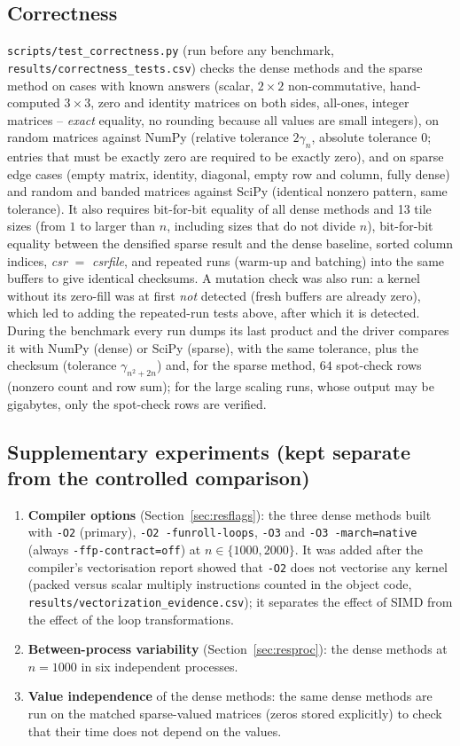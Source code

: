 \subsection{Correctness}
\label{sec:correct}
\texttt{scripts/test\_correctness.py} (run before any benchmark, \texttt{results/correctness\_tests.csv}) checks the dense methods and the sparse method on cases with known answers
(scalar, $2\times2$ non-commutative, hand-computed $3\times3$, zero and identity matrices on both sides, all-ones, integer matrices -- \emph{exact} equality, no rounding because all values are
small integers), on random matrices against NumPy (relative tolerance $2\gamma_n$, absolute tolerance $0$; entries that must be exactly zero are required to be exactly zero), and on sparse edge cases (empty matrix, identity, diagonal,
empty row and column, fully dense) and random and banded matrices against SciPy (identical nonzero pattern, same tolerance). It also requires bit-for-bit equality of all dense methods
and 13 tile sizes (from $1$ to larger than $n$, including sizes that do not divide $n$), bit-for-bit equality between the densified sparse result and the dense baseline, sorted column indices, \emph{csr} $=$ \emph{csrfile}, and repeated runs
(warm-up and batching) into the same buffers to give identical checksums. A mutation check was also run: a kernel without its zero-fill was at first \emph{not} detected (fresh buffers are already zero), which led to adding the repeated-run tests above, after which it is detected. During the benchmark every run dumps its last product and the driver compares it with NumPy (dense) or SciPy (sparse), with the same tolerance, plus the checksum
(tolerance $\gamma_{n^2+2n}$) and, for the sparse method, $64$ spot-check rows (nonzero count and row sum); for the large scaling runs, whose output may be gigabytes, only the spot-check rows are verified.

\subsection{Supplementary experiments (kept separate from the controlled comparison)}
\label{sec:supp}
\begin{enumerate}
  \item \textbf{Compiler options} (Section~\ref{sec:resflags}): the three dense methods built with \texttt{-O2} (primary), \texttt{-O2 -funroll-loops}, \texttt{-O3} and \texttt{-O3 -march=native}
        (always \texttt{-ffp-contract=off}) at $n\in\{1000,2000\}$. It was added after the compiler's vectorisation report showed that \texttt{-O2} does not vectorise any kernel
        (packed versus scalar multiply instructions counted in the object code, \texttt{results/vectorization\_evidence.csv}); it separates the effect of SIMD from the effect of the loop transformations.
  \item \textbf{Between-process variability} (Section~\ref{sec:resproc}): the dense methods at $n=1000$ in six independent processes.
  \item \textbf{Value independence} of the dense methods: the same dense methods are run on the matched sparse-valued matrices (zeros stored explicitly) to check that their time does not depend on the values.
\end{enumerate}
